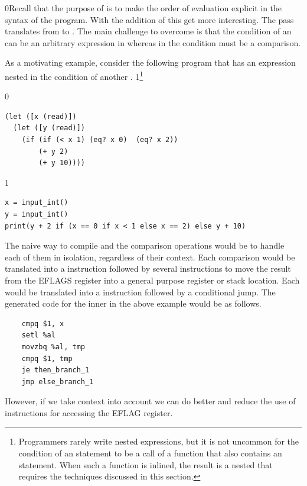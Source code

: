 \documentclass[7x10,nocrop]{TimesAPriori_MIT}%
\def\racketEd{0}
\def\pythonEd{1}
\def\edition{0}
\newcommand{\racket}[1]{{\if\edition\racketEd{#1}\fi}}
\newcommand{\python}[1]{{\if\edition\pythonEd #1\fi}}
\begin{document}
\racket{Recall that the purpose of  is to
  make the order of evaluation explicit in the syntax of the program.
  With the addition of \key{if} this get more interesting.}
%
The  pass translates from \LangIf{} to \LangCIf{}.
%
The main challenge to overcome is that the condition of an 
can be an arbitrary expression in \LangIf{} whereas in \LangCIf{} the
condition must be a comparison.

As a motivating example, consider the following program that has an
 expression nested in the condition of another .%
\python{\footnote{Programmers rarely write nested 
  expressions, but it is not uncommon for the condition of an
  \code{if} statement to be a call of a function that also contains an
  \code{if} statement.  When such a function is inlined, the result is
  a nested \code{if} that requires the techniques discussed in this
  section.}}
\begin{center}
\begin{minipage}{0.96\textwidth}
{\if\edition\racketEd        
\begin{lstlisting}
(let ([x (read)])
  (let ([y (read)])
    (if (if (< x 1) (eq? x 0)  (eq? x 2))
        (+ y 2)
        (+ y 10))))
\end{lstlisting}
\fi}
{\if\edition\pythonEd
\begin{lstlisting}
x = input_int()
y = input_int()
print(y + 2 if (x == 0 if x < 1 else x == 2) else y + 10)
\end{lstlisting}
\fi}
\end{minipage}
\end{center}
%
The naive way to compile  and the comparison operations would
be to handle each of them in isolation, regardless of their context.
Each comparison would be translated into a  instruction
followed by several instructions to move the result from the EFLAGS
register into a general purpose register or stack location. Each
 would be translated into a  instruction followed by
a conditional jump. The generated code for the inner  in the
above example would be as follows.
\begin{center}
\begin{minipage}{0.96\textwidth}
\begin{lstlisting}
    cmpq $1, x
    setl %al
    movzbq %al, tmp
    cmpq $1, tmp
    je then_branch_1
    jmp else_branch_1
\end{lstlisting}
\end{minipage}
\end{center}
However, if we take context into account we can do better and reduce
the use of  instructions for accessing the EFLAG register.
\end{document}
